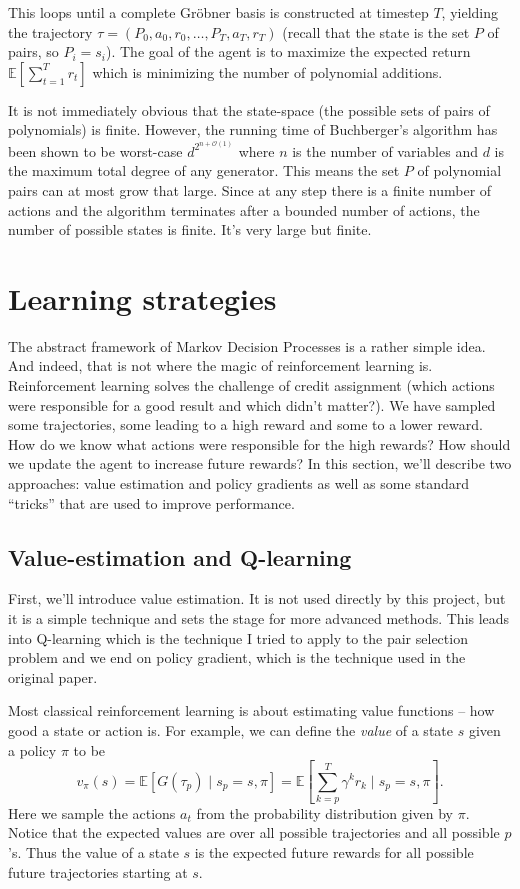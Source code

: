 \documentclass{article}
\theoremstyle{changedot}
\theoremstyle{changedotbreak}
\theoremstyle{nonumberplain}
\newcommand{\m}{\mathbb}
\begin{document}
This loops until a complete Gröbner basis is constructed at timestep $T$, yielding the trajectory $\tau = (P_{0}, a_{0}, r_{0}, \dots, P_{T}, a_{T}, r_{T})$ (recall that the state is the set $P$ of pairs, so $P_{i} = s_{i}$). The goal of the agent is to maximize the expected return $\m E[\sum_{t=1}^{T} r_{t}]$ which is minimizing the number of polynomial additions.

It is not immediately obvious that the state-space (the possible sets of pairs of polynomials) is finite. However, the running time of Buchberger's algorithm has been shown to be worst-case $d^{2^{n+\mathcal{O}(1)}}$ where $n$ is the number of variables and $d$ is the maximum total degree of any generator. This means the set $P$ of polynomial pairs can at most grow that large. Since at any step there is a finite number of actions and the algorithm terminates after a bounded number of actions, the number of possible states is finite. It's very large but finite.

\section{Learning strategies}
The abstract framework of Markov Decision Processes is a rather simple idea. And indeed, that is not where the magic of reinforcement learning is. Reinforcement learning solves the challenge of credit assignment (which actions were responsible for a good result and which didn't matter?). We have sampled some trajectories, some leading to a high reward and some to a lower reward. How do we know what actions were responsible for the high rewards? How should we update the agent to increase future rewards? In this section, we'll describe two approaches: value estimation and policy gradients as well as some standard ``tricks'' that are used to improve performance.

\subsection{Value-estimation and Q-learning}\label{sec:Qlearning}
First, we'll introduce value estimation. It is not used directly by this project, but it is a simple technique and sets the stage for more advanced methods. This leads into Q-learning which is the technique I tried to apply to the pair selection problem and we end on policy gradient, which is the technique used in the original paper.

Most classical reinforcement learning is about estimating value functions -- how good a state or action is. For example, we can define the \emph{value} of a state $s$ given a policy $\pi$ to be \[v_{\pi}(s) = \mathbb E \left[ G(\tau_{p}) \mid s_{p} = s, \pi \right] = \m E \left[ \sum_{k=p}^{T} \gamma^{k} r_{k} \mid s_{p} = s, \pi \right].\] Here we sample the actions $a_{t}$ from the probability distribution given by $\pi$. Notice that the expected values are over all possible trajectories and all possible $p$'s. Thus the value of a state $s$ is the expected future rewards for all possible future trajectories starting at $s$.
\end{document}
